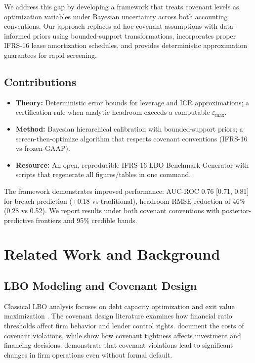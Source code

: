 \documentclass[11pt,a4paper]{article}
\theoremstyle{plain}
\theoremstyle{definition}
\begin{document}
We address this gap by developing a framework that treats covenant levels as optimization variables under Bayesian uncertainty across both accounting conventions. Our approach replaces ad hoc covenant assumptions with data-informed priors using bounded-support transformations, incorporates proper IFRS-16 lease amortization schedules, and provides deterministic approximation guarantees for rapid screening.

\subsection{Contributions}

\begin{itemize}\setlength{\itemsep}{0pt}
\item \textbf{Theory:} Deterministic error bounds for leverage and ICR approximations; a certification rule when analytic headroom exceeds a computable $\varepsilon_{\max}$.
\item \textbf{Method:} Bayesian hierarchical calibration with bounded-support priors; a screen-then-optimize algorithm that respects covenant conventions (IFRS-16 vs frozen-GAAP).
\item \textbf{Resource:} An open, reproducible IFRS-16 LBO Benchmark Generator with scripts that regenerate all figures/tables in one command.
\end{itemize}

The framework demonstrates improved performance: AUC-ROC 0.76 [0.71, 0.81] for breach prediction (+0.18 vs traditional), headroom RMSE reduction of 46\% (0.28 vs 0.52). We report results under both covenant conventions with posterior-predictive frontiers and 95\% credible bands.

\section{Related Work and Background}

\subsection{LBO Modeling and Covenant Design}

Classical LBO analysis focuses on debt capacity optimization and exit value maximization \citep{kaplan1989effects}. The covenant design literature examines how financial ratio thresholds affect firm behavior and lender control rights. \citet{dichev2002quality} document the costs of covenant violations, while \citet{ivashina2011covenant} show how covenant tightness affects investment and financing decisions. \citet{nini2009creditor} demonstrate that covenant violations lead to significant changes in firm operations even without formal default.
\end{document}
